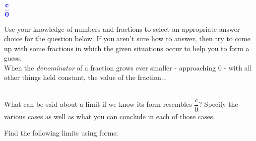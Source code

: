 \documentclass[10pt]{article}
\begin{document}
\lform ${\color{blue}\bf \dfrac{c}{0}}$

  Use your knowledge of numbers and fractions to select an appropriate answer choice for the question below. If you aren't sure how to answer, then try to come up with some fractions in which the given situations occur to help you to form a guess.\\

When the {\it denominator} of a fraction grows ever smaller - approaching $0$ - with all other things held constant, the value of the fraction...\\
\\

\newpage

\minil What can be said about a limit if we know its form resembles $\dfrac{c}{0}$? Specify the various cases as well as what you can conclude in each of those cases.\\
\vfill
\vfill

 Find the following limits using forms:
\end{document}
